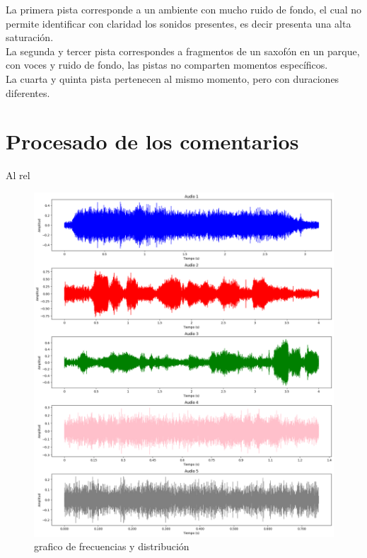  La primera pista corresponde a un ambiente con mucho ruido de fondo, el cual no permite identificar con  claridad los sonidos presentes, es decir presenta una alta saturación.\\
 
 La segunda y tercer pista correspondes a fragmentos de un saxofón en un parque, con voces y ruido de fondo, las pistas no comparten  momentos específicos.\\
 
 La cuarta y quinta pista pertenecen al mismo momento, pero con duraciones diferentes.\\
 

\chapter{Procesado de los comentarios}

Al rel

\begin{figure}[!h]
	\centering
	\includegraphics[width=15cm]{Images/Amplitudes}
	\caption{grafico de frecuencias y distribución}
	\label{fig:FyD}
\end{figure}


